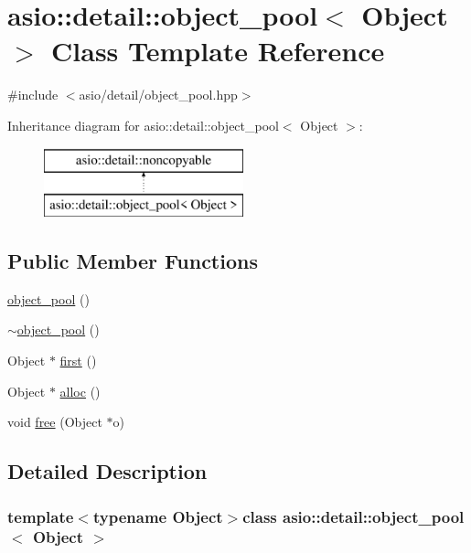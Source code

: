 \hypertarget{classasio_1_1detail_1_1object__pool}{}\section{asio\+:\+:detail\+:\+:object\+\_\+pool$<$ Object $>$ Class Template Reference}
\label{classasio_1_1detail_1_1object__pool}


{\ttfamily \#include $<$asio/detail/object\+\_\+pool.\+hpp$>$}

Inheritance diagram for asio\+:\+:detail\+:\+:object\+\_\+pool$<$ Object $>$\+:\begin{figure}[H]
\begin{center}
\leavevmode
\includegraphics[height=2.000000cm]{classasio_1_1detail_1_1object__pool}
\end{center}
\end{figure}
\subsection*{Public Member Functions}
\begin{DoxyCompactItemize}
\item 
\hyperlink{classasio_1_1detail_1_1object__pool_a0014c859482bd18bef8df48f92975603}{object\+\_\+pool} ()
\item 
\hyperlink{classasio_1_1detail_1_1object__pool_a871aeb2e78c8ec2dede4ba8b077174ed}{$\sim$object\+\_\+pool} ()
\item 
Object $\ast$ \hyperlink{classasio_1_1detail_1_1object__pool_a2ee4a226bdb3c4193b6dac5c7c6badbc}{first} ()
\item 
Object $\ast$ \hyperlink{classasio_1_1detail_1_1object__pool_a0cd123c550e8a7a3b624554c581e1f70}{alloc} ()
\item 
void \hyperlink{classasio_1_1detail_1_1object__pool_a9da43a33ccc3024076dd0c5fd662c6a2}{free} (Object $\ast$o)
\end{DoxyCompactItemize}


\subsection{Detailed Description}
\subsubsection*{template$<$typename Object$>$class asio\+::detail\+::object\+\_\+pool$<$ Object $>$}



